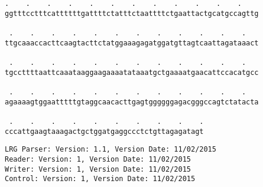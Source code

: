 \documentclass{article}
\begin{document}
\begin{Verbatim}[fontfamily=courier]
 .    .    .    .    .    .    .    .    .    .    .    .   
ggtttcctttcattttttgattttctatttctaattttctgaattactgcatgccagttg

 .    .    .    .    .    .    .    .    .    .    .    .   
ttgcaaaccacttcaagtacttctatggaaagagatggatgttagtcaattagataaact

 .    .    .    .    .    .    .    .    .    .    .    .   
tgccttttaattcaaataaggaagaaaatataaatgctgaaaatgaacattccacatgcc

 .    .    .    .    .    .    .    .    .    .    .    .   
agaaaagtggaatttttgtaggcaacacttgagtggggggagacgggccagtctatacta

 .    .    .    .    .    .    .    .    .    .
cccattgaagtaaagactgctggatgaggccctctgttagagatagt
\end{Verbatim}
\newpage
\begin{Verbatim}[fontfamily=courier]
LRG Parser: Version: 1.1, Version Date: 11/02/2015
Reader: Version: 1, Version Date: 11/02/2015
Writer: Version: 1, Version Date: 11/02/2015
Control: Version: 1, Version Date: 11/02/2015
\end{Verbatim}
\end{document}
